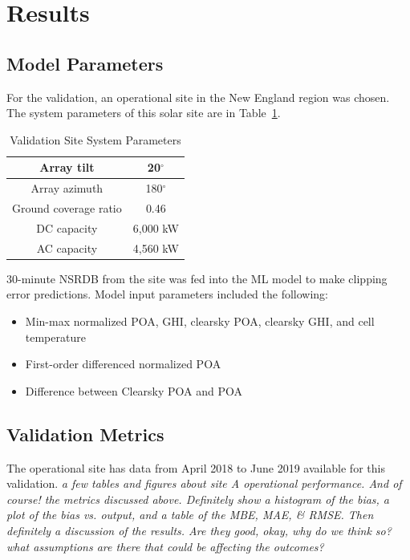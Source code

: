 \documentclass[conference]{IEEEtran}
\begin{document}
\section{Results}

\subsection{Model Parameters}

For the validation, an operational site in the New England region was chosen. The system parameters of this solar site are in Table~\ref{table1}.

\begin{table}[htbp]
\caption{Validation Site System Parameters}
\begin{center}
\begin{tabular}{ |c|c| } 
\hline
Array tilt & 20$^{\circ}$ \\
\hline
Array azimuth & 180$^{\circ}$ \\
\hline
Ground coverage ratio & 0.46 \\
\hline
DC capacity & 6,000 kW \\
\hline
AC capacity & 4,560 kW \\
\hline
\end{tabular}
\end{center}
\label{table1}
\end{table}

30-minute NSRDB from the site was fed into the ML model to make clipping error predictions. Model input parameters included the following:
\begin{itemize}
\item Min-max normalized POA, GHI, clearsky POA, clearsky GHI, and cell temperature
\item First-order differenced normalized POA
\item Difference between Clearsky POA and POA
\end{itemize}

\subsection{Validation Metrics}
The operational site has data from April 2018 to June 2019 available for this validation.
\textit{\color{red}a few tables and figures about site A operational performance. And of course! the metrics discussed above. Definitely show a histogram of the bias, a plot of the bias vs. output, and a table of the MBE, MAE, \& RMSE. Then definitely a discussion of the results. Are they good, okay, why do we think so? what assumptions are there that could be affecting the outcomes?}
\end{document}
